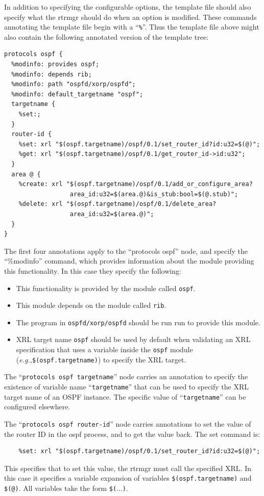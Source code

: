 \documentclass[11pt]{article}
\newcommand{\eg}{\emph{e.g.,}\xspace}
\begin{document}
In addition to specifying the configurable options, the template file
should also specify what the rtrmgr should do when an option is
modified.  These commands annotating the template file begin with a
``{\tt \%}''.  Thus the template file above might also contain the
following annotated version of the template tree:
\begin{verbatim}
protocols ospf {
  %modinfo: provides ospf;
  %modinfo: depends rib;
  %modinfo: path "ospfd/xorp/ospfd";
  %modinfo: default_targetname "ospf";
  targetname {
    %set:;
  }
  router-id {
    %set: xrl "$(ospf.targetname)/ospf/0.1/set_router_id?id:u32=$(@)";
    %get: xrl "$(ospf.targetname)/ospf/0.1/get_router_id->id:u32";
  }
  area @ {
    %create: xrl "$(ospf.targetname)/ospf/0.1/add_or_configure_area?
                  area_id:u32=$(area.@)&is_stub:bool=$(@.stub)";
    %delete: xrl "$(ospf.targetname)/ospf/0.1/delete_area?
                  area_id:u32=$(area.@)";
  }
}
\end{verbatim}
The first four annotations apply to the ``protocols ospf'' node, and
specify the ``\%modinfo'' command, which provides information about
the module providing this functionality.  In this case they specify
the following:
\begin{itemize}

  \item This functionality is provided by the module called {\tt ospf}.

  \item This module depends on the module called {\tt rib}.

  \item The program in {\tt ospfd/xorp/ospfd} should be run run to
        provide this module.

  \item XRL target name {\tt ospf} should be used by default when validating
    an XRL specification that uses a variable inside the {\tt ospf} module
    (\eg {\tt \$(ospf.targetname)}) to specify the XRL target.

\end{itemize}

The ``{\tt protocols ospf targetname}'' node carries an annotation to
specify the existence of variable name ``{\tt targetname}'' that
can be used to specify the XRL target name of an OSPF instance.
The specific value of ``{\tt targetname}'' can be configured elsewhere.

The ``{\tt protocols ospf router-id}'' node carries annotations to set
the value of the router ID in the ospf process, and to get the value
back.  The set command is:
\begin{verbatim}
    %set: xrl "$(ospf.targetname)/ospf/0.1/set_router_id?id:u32=$(@)";
\end{verbatim}
This specifies that to set this value, the rtrmgr must call the
specified XRL.  In this case it specifies a variable expansion of
variables {\tt \$(ospf.targetname)} and  {\tt \$(@)}.  All variables take the
form {\tt \$(}...{\tt )}.   
\end{document}

